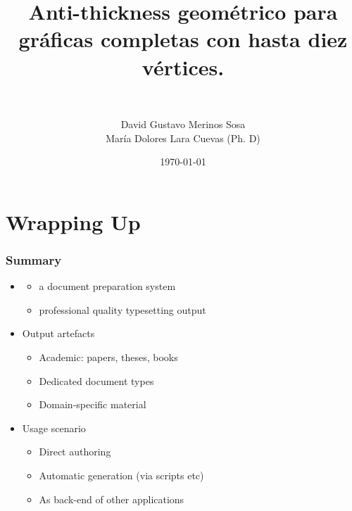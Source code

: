 \documentclass[xcolor={x11names,svgnames,dvipsnames},trans]{beamer}
\author{David Gustavo Merinos Sosa \\ María Dolores Lara Cuevas (Ph. D)}
\title{Anti-thickness geométrico para gráficas completas con hasta diez vértices.}
\subtitle{\texorpdfstring{
\hrulefill\ \adforn{57}\thickspace\pgfornament[height=0.75em,ydelta=-0.25em]{1}\thickspace\adforn{29}\ \hrulefill}{ }}
\date{\today}
\begin{document}
\begin{frame}[plain]
\maketitle
\end{frame}




\section{Wrapping Up} 

\begin{frame}
\frametitle{Summary}
\begin{itemize}
\item<+-> 
	\begin {itemize}
	\item a document preparation system
	\item professional quality typesetting output
	\end{itemize}
\item<+-> Output artefacts
	\begin{itemize}
	\item Academic: papers, theses, books
	\item Dedicated document types
	\item Domain-specific material
	\end{itemize}
\item<+-> Usage scenario
	\begin{itemize}
	\item Direct authoring
	\item Automatic generation (via scripts etc)
	\item As back-end of other applications
	\end{itemize}
\end{itemize}
\end{frame}
\end{document}
